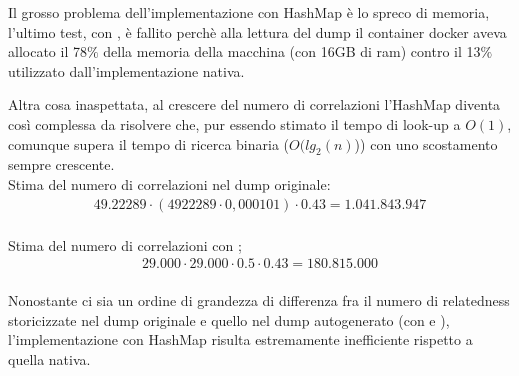 Il grosso problema dell'implementazione con HashMap è lo spreco di memoria, l'ultimo test, con , è fallito perchè alla lettura del dump il container docker aveva allocato il 
78$\%$ della memoria della macchina (con 16GB di ram) contro il 13$\%$ utilizzato dall'implementazione nativa. 

Altra cosa inaspettata, al crescere del numero di correlazioni l'HashMap diventa così complessa da risolvere che, pur essendo stimato il tempo di look-up a $O(1)$, comunque supera il tempo 
di ricerca binaria ($O(lg_2(n)$)) con uno scostamento sempre crescente.\\

Stima del numero di correlazioni nel dump originale: 
\begin{equation}\begin{split}
    49.22289 \cdot (4922289 \cdot 0,000101) \cdot 0.43 = 1.041.843.947\\
\end{split}\end{equation}

Stima del numero di correlazioni con ; 
\begin{equation}\begin{split}
    29.000 \cdot 29.000 \cdot 0.5 \cdot 0.43 = 180.815.000 \\
\end{split}\end{equation}

Nonostante ci sia un ordine di grandezza di differenza fra il numero di relatedness storicizzate nel dump originale e quello nel dump autogenerato (con  e ), 
l'implementazione con HashMap risulta estremamente inefficiente rispetto a quella nativa. 